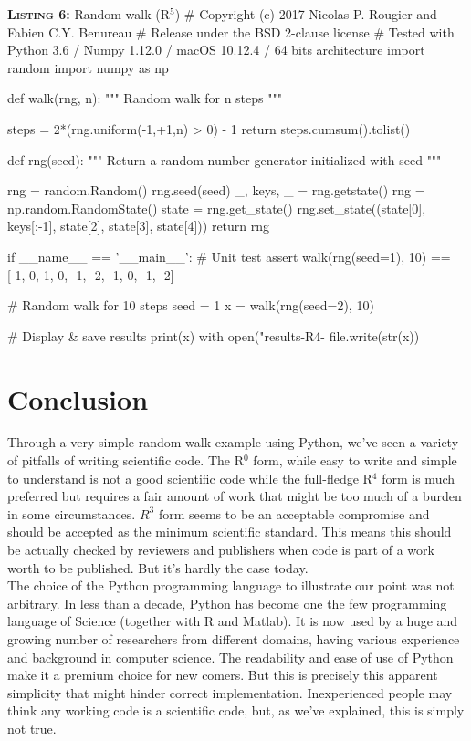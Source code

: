 \documentclass[a4paper,11pt]{article}
\begin{document}
\begin{code}{\textbf{\textsc{Listing 6:}} Random walk (R$^5$)}
# Copyright (c) 2017 Nicolas P. Rougier and Fabien C.Y. Benureau
# Release under the BSD 2-clause license
# Tested with Python 3.6 / Numpy 1.12.0 / macOS 10.12.4 / 64 bits architecture
import random
import numpy as np

def walk(rng, n):
    """ Random walk for n steps """

    steps = 2*(rng.uniform(-1,+1,n) > 0) - 1
    return steps.cumsum().tolist()

def rng(seed):
    """ Return a random number generator initialized with seed """ 
    
    rng = random.Random()
    rng.seed(seed)
    _, keys, _ = rng.getstate()
    rng = np.random.RandomState()
    state = rng.get_state()
    rng.set_state((state[0], keys[:-1], state[2], state[3], state[4]))
    return rng

if __name__ == '__main__':
    # Unit test
    assert walk(rng(seed=1), 10) == [-1, 0, 1, 0, -1, -2, -1, 0, -1, -2]

    # Random walk for 10 steps
    seed = 1
    x = walk(rng(seed=2), 10)

    # Display & save results
    print(x)
    with open("results-R4-%
        file.write(str(x))
\end{code}



\section*{Conclusion}

Through a very simple random walk example using Python, we've seen a variety of pitfalls of writing scientific code. The R$^0$ form, while easy to write and simple to understand is not a good scientific code while the full-fledge R$^{4}$ form is much preferred but requires a fair amount of work that might be too much of a burden in some circumstances. $R^3$ form seems to be an acceptable compromise and should be accepted as the minimum scientific standard. This means this should be actually checked by reviewers and publishers when code is part of a work worth to be published. But it's hardly the case today.\\

The choice of the Python programming language to illustrate our point was not arbitrary. In less than a decade, Python has become one the few programming language of Science (together with R and Matlab). It is now used by a huge and growing number of researchers from different domains, having various experience and background in computer science. The readability and ease of use of Python make it a premium choice for new comers. But this is precisely this apparent simplicity that might hinder correct implementation. Inexperienced people may think any working code is a scientific code, but, as we've explained, this is simply not true.
\end{document}
